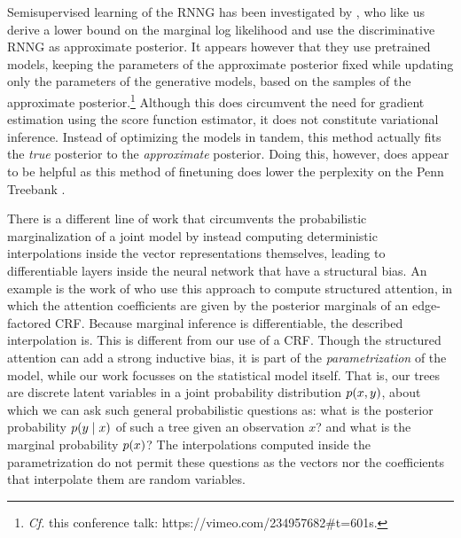   Semisupervised learning of the RNNG has been investigated by \citet{cheng2017rnng}, who like us derive a lower bound on the marginal log likelihood and use the discriminative RNNG as approximate posterior. It appears however that they use pretrained models, keeping the parameters of the approximate posterior fixed while updating only the parameters of the generative models, based on the samples of the approximate posterior.\footnote{\textit{Cf.} this conference talk: https://vimeo.com/234957682\#t=601s.} Although this does circumvent the need for gradient estimation using the score function estimator, it does not constitute variational inference. Instead of optimizing the models in tandem, this method actually fits the \textit{true} posterior to the \textit{approximate} posterior. Doing this, however, does appear to be helpful as this method of finetuning does lower the perplexity on the Penn Treebank \citep{cheng2017rnng}.

  There is a different line of work that circumvents the probabilistic marginalization of a joint model by instead computing deterministic interpolations inside the vector representations themselves, leading to differentiable layers inside the neural network that have a structural bias. An example is the work of \citet{kim2017structured} who use this approach to compute structured attention, in which the attention coefficients are given by the posterior marginals of an edge-factored CRF. Because marginal inference is differentiable, the described interpolation is. This is different from our use of a CRF. Though the structured attention can add a strong inductive bias, it is part of the \textit{parametrization} of the model, while our work focusses on the statistical model itself. That is, our trees are discrete latent variables in a joint probability distribution $p(x, y)$, about which we can ask such general probabilistic questions as: what is the posterior probability $p(y \mid x)$ of such a tree given an observation $x$? and what is the marginal probability $p(x)$? The interpolations computed inside the parametrization do not permit these questions as the vectors nor the coefficients that interpolate them are random variables.

